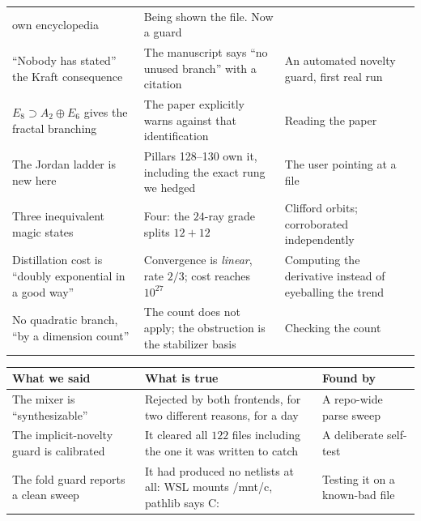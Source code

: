 \documentclass[11pt,a4paper]{article}
\newcommand{\cmd}[1]{{\ttfamily #1}}
\begin{document}
{\begin{center}
\begin{tabular}{@{}p{4.9cm}p{4.4cm}p{4.8cm}@{}}
  own encyclopedia & Being shown the file. Now a guard \\
``Nobody has stated'' the Kraft consequence & The manuscript says ``no unused branch''
  with a citation & An automated novelty guard, first real run \\
$E_8\supset A_2\oplus E_6$ gives the fractal branching & The paper explicitly warns
  against that identification & Reading the paper \\
The Jordan ladder is new here & Pillars 128--130 own it, including the exact rung we
  hedged & The user pointing at a file \\
Three inequivalent magic states & Four: the $24$-ray grade splits $12+12$ & Clifford
  orbits; corroborated independently \\
Distillation cost is ``doubly exponential in a good way'' & Convergence is \emph{linear},
  rate $2/3$; cost reaches $10^{27}$ & Computing the derivative instead of eyeballing
  the trend \\
No quadratic branch, ``by a dimension count'' & The count does not apply; the obstruction
  is the stabilizer basis & Checking the count \\
\bottomrule
\end{tabular}
\end{center}}


{\footnotesize
\begin{center}
\begin{tabular}{@{}p{4.9cm}p{4.4cm}p{4.8cm}@{}}
\toprule
\textbf{What we said} & \textbf{What is true} & \textbf{Found by}\\
\midrule
The mixer is ``synthesizable'' & Rejected by both frontends, for two different reasons,
  for a day & A repo-wide parse sweep \\
The implicit-novelty guard is calibrated & It cleared all $122$ files including the one it
  was written to catch & A deliberate self-test \\
The fold guard reports a clean sweep & It had produced no netlists at all: WSL mounts
  \cmd{/mnt/c}, pathlib says \cmd{C:} & Testing it on a known-bad file \\
\bottomrule
\end{tabular}
\end{center}}
\end{document}
